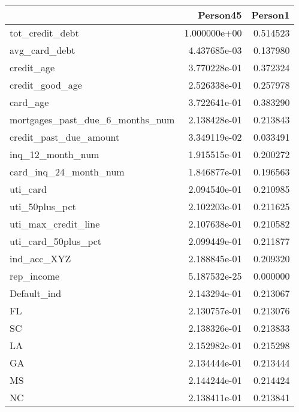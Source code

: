 \begin{tabular}{lrr}
\toprule
{} &      Person45 &   Person1 \\
\midrule
tot\_credit\_debt                         &  1.000000e+00 &  0.514523 \\
avg\_card\_debt                           &  4.437685e-03 &  0.137980 \\
credit\_age                              &  3.770228e-01 &  0.372324 \\
credit\_good\_age                         &  2.526338e-01 &  0.257978 \\
card\_age                                &  3.722641e-01 &  0.383290 \\
mortgages\_past\_due\_6\_months\_num         &  2.138428e-01 &  0.213843 \\
credit\_past\_due\_amount                  &  3.349119e-02 &  0.033491 \\
inq\_12\_month\_num                        &  1.915515e-01 &  0.200272 \\
card\_inq\_24\_month\_num                   &  1.846877e-01 &  0.196563 \\
uti\_card                                &  2.094540e-01 &  0.210985 \\
uti\_50plus\_pct                          &  2.102203e-01 &  0.211625 \\
uti\_max\_credit\_line                     &  2.107638e-01 &  0.210582 \\
uti\_card\_50plus\_pct                     &  2.099449e-01 &  0.211877 \\
ind\_acc\_XYZ                             &  2.188845e-01 &  0.209320 \\
rep\_income                              &  5.187532e-25 &  0.000000 \\
Default\_ind                             &  2.143294e-01 &  0.213067 \\
FL                                      &  2.130757e-01 &  0.213076 \\
SC                                      &  2.138326e-01 &  0.213833 \\
LA                                      &  2.152982e-01 &  0.215298 \\
GA                                      &  2.134444e-01 &  0.213444 \\
MS                                      &  2.144244e-01 &  0.214424 \\
NC                                      &  2.138411e-01 &  0.213841 \\

\end{tabular}
